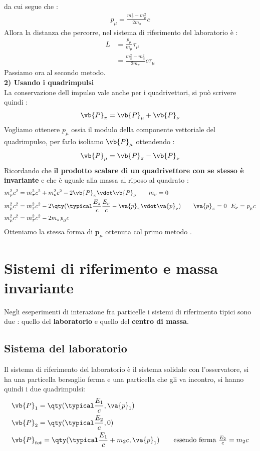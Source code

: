 \documentclass[a4paper, 12pt, twoside]{report}
\begin{document}
da cui segue che : 
\begin{align*}
        \textit{p}_{\mu} = \frac{m_{\pi}^2 - m_{\mu}^2}{2m_{\pi}}c
\end{align*}
Allora la distanza che percorre, nel sistema di riferimento del laboratorio è : 
\begin{align*}
        L &= \frac{\textit{p}_{\mu}}{m_{\mu}}\tau_{\mu}\\
          &= \frac{m_{\pi}^2 - m_{\mu}^2}{2m_{\pi}}c\tau_{\mu}
\end{align*}
Passiamo ora al secondo metodo. \\
\textbf{2) Usando i quadrimpulsi}\\
La conservazione dell impulso vale anche per i quadrivettori, si può scrivere quindi : 
\begin{align*}
    \vb{P}_{\pi} = \vb{P}_{\mu} + \vb{P}_{\nu}
\end{align*}
Vogliamo ottenere $\textit{p}_{\mu}$ ossia il modulo della componente vettoriale del quadrimpulso, per farlo 
isoliamo $\vb{P}_{\mu}$ ottendendo : 
\begin{align*}
    \vb{P}_{\mu} = \vb{P}_{\pi} - \vb{P}_{\nu}
\end{align*}
Ricordando che \textbf{il prodotto scalare di un quadrivettore con se stesso è invariante} e che è uguale alla massa al riposo 
al quadrato : 
\begin{align*}
        m_{\mu}^2c^2 &= m_{\pi}^2c^2 + m_{\nu}^2c^2 -2\vb{P}_{\pi}\vdot\vb{P}_{\nu}  \tag*{$m_{\nu} = 0$} \\
        m_{\mu}^2c^2 &= m_{\pi}^2c^2 -2\qty(\typical \frac{E_{\pi}}{c} \frac{E_{\nu}}{c} - \va{p}_{\pi}\vdot\va{p}_{\nu}) \tag*{$\va{p}_{\pi} = 0$ \ $E_{\nu} = \textit{p}_{\mu}c$}\\
        m_{\mu}^2c^2 &= m_{\pi}^2c^2 -2m_{\pi}\textit{p}_{\mu}c 
\end{align*}
Otteniamo la stessa forma di $\textbf{p}_{\mu}$ ottenuta col primo metodo . 
\newpage
\chapter{Sistemi di riferimento e massa invariante}
Negli eseperimenti di interazione fra particelle i sistemi di riferimento tipici sono due : quello del \textbf{laboratorio} e quello del \textbf{centro di massa}.
\section{Sistema del laboratorio}
Il sistema di riferimento del laboratorio è il sistema solidale con l'osservatore, si ha una particella bersaglio ferma e una particella che gli va incontro, si hanno 
quindi i due quadrimpulsi: 
\begin{align*}
        &\vb{P}_1 = \qty(\typical \frac{E_1}{c},\va{p}_1) \\
        &\vb{P}_2 = \qty(\typical \frac{E_2}{c}, 0) \\
        &\vb{P}_{tot} = \qty(\typical \frac{E_1}{c} + m_2c, \va{p}_1) \tag*{essendo ferma $ \frac{E_2}{c} = m_2c $}
\end{align*}
\end{document}
